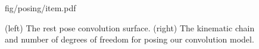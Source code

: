 \begin{figure}[t!]
\centering
\begin{overpic} 
[width=\linewidth]
{fig/posing/item.pdf}
\end{overpic}
\caption{
% 
% 
(left) The rest pose convolution surface. 
(right) The kinematic chain and number of degrees of freedom for posing our convolution model. 
% 
% 
}
\label{fig:posing}
\end{figure}